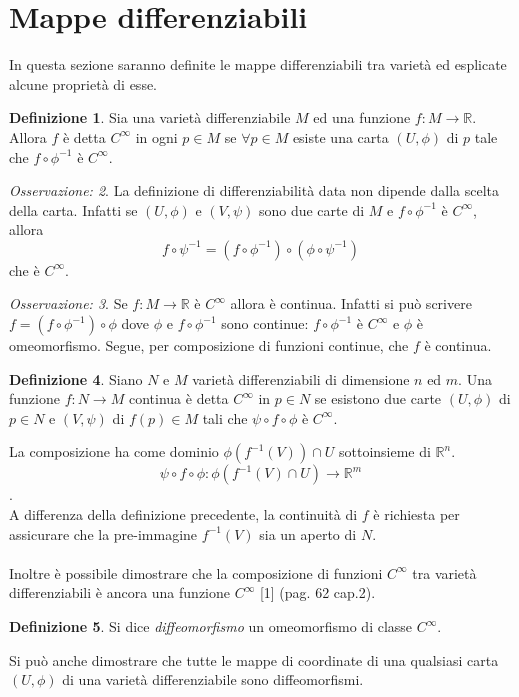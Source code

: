 \documentclass[12pt,a4paper]{report}
\theoremstyle{definition}
\newtheorem{Def}{Definizione}[chapter]
\theoremstyle{definition}
\theoremstyle{definition}
\theoremstyle{remark}
\newtheorem{Obs}[Def]{Osservazione:}
\begin{document}
\section{Mappe differenziabili}
In questa sezione saranno definite le mappe differenziabili tra varietà ed esplicate alcune proprietà di esse.
\begin{Def}
	Sia una varietà differenziabile $M$ ed una funzione $f:M\rightarrow\mathbb{R}$. Allora $f$ è detta $C^\infty$ in ogni $p\in M$ se $\forall p\in M$ esiste una carta $(U,\phi)$ di $p$ tale che $f\circ \phi^{-1}$ è $C^\infty$.
\end{Def}
\begin{Obs}
	La definizione di differenziabilità data non dipende dalla scelta della carta. Infatti se $(U,\phi)$ e $(V,\psi)$ sono due carte di $M$ e $f\circ\phi^{-1}$ è $C^\infty$, allora $$f\circ\psi^{-1}=(f\circ\phi^{-1})\circ(\phi\circ\psi^{-1})$$ che è $C^\infty$.
\end{Obs}
\begin{Obs}
	Se $f:M\rightarrow \mathbb{R}$ è $C^\infty$ allora è continua. Infatti si può scrivere $f=(f\circ\phi^{-1})\circ \phi$ dove $\phi$ e $f\circ\phi^{-1}$ sono continue: $f\circ\phi^{-1}$ è $C^\infty$ e $\phi$ è omeomorfismo. Segue, per composizione di funzioni continue, che $f$ è continua.\\
\end{Obs}
\begin{Def}
	Siano $N$ e $M$ varietà differenziabili di dimensione $n$ ed $m$. Una funzione $f:N\rightarrow M$ continua è detta $C^\infty$ in $p\in N$ se esistono due carte $(U,\phi)$ di $p\in N$ e $(V,\psi)$ di $f(p)\in M$ tali che $\psi\circ f\circ \phi$ è $C^\infty$.
\end{Def}
La composizione ha come dominio $\phi(f^{-1}(V))\cap U$ sottoinsieme di $\mathbb{R}^n$. $$\psi\circ f\circ \phi:\phi(f^{-1}(V)\cap U)\rightarrow \mathbb{R}^m$$.\\
A differenza della definizione precedente, la continuità di $f$ è richiesta per assicurare che la pre-immagine $f^{-1}(V)$ sia un aperto di $N$.\\
\\
Inoltre è possibile dimostrare che la composizione di funzioni $C^\infty$ tra varietà differenziabili è ancora una funzione $C^\infty$ [1] (pag. 62 cap.2). 
\begin{Def}
	Si dice \textit{diffeomorfismo} un omeomorfismo di classe $C^\infty$.
\end{Def}
Si può anche dimostrare che tutte le mappe di coordinate di una qualsiasi carta $(U,\phi)$ di una varietà differenziabile sono diffeomorfismi. 
\end{document}
